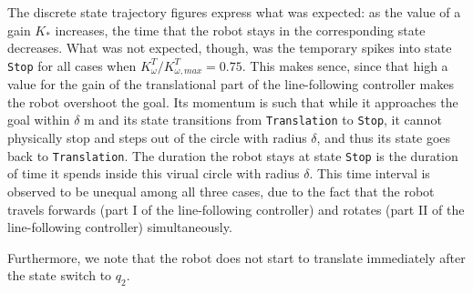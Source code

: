 The discrete state trajectory figures express what was expected: as the value
of a gain $K_{*}$ increases, the time that the robot stays in the corresponding
state decreases. What was not expected, though, was the temporary spikes into
state \texttt{Stop} for all cases when $K_{\omega}^T / K_{\omega,max}^T = 0.75$.
This makes sence, since that high a value for the gain of the translational
part of the line-following controller makes the robot overshoot the goal. Its
momentum is such that while it approaches the goal within $\delta$ m and its
state transitions from \texttt{Translation} to \texttt{Stop}, it cannot physically
stop and steps out of the circle with radius $\delta$, and thus its state goes back
to \texttt{Translation}. The duration the robot stays at state \texttt{Stop} is
the duration of time it spends inside this virual circle with radius $\delta$.
This time interval is observed to be unequal among all three cases, due to the
fact that the robot travels forwards (part I of the line-following controller)
and rotates (part II of the line-following controller) simultaneously.

Furthermore, we note that the robot does not start to translate immediately after
the state switch to $q_2$.


\begin{figure}[H]
\begin{multicols}{2}
\quad
{}

\quad
{}

\quad
{}

\end{multicols}
\caption{}
\label{multifig:19_1}
\end{figure}

